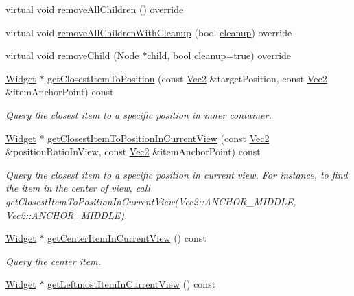 \begin{DoxyCompactItemize}
\item 
virtual void \hyperlink{classui_1_1ListView_acfa88e95692c1e9713697fbd2754379b}{remove\+All\+Children} () override
\item 
virtual void \hyperlink{classui_1_1ListView_a04bcc9bd8c55dea8f034a8380b3ab3a8}{remove\+All\+Children\+With\+Cleanup} (bool \hyperlink{classProtectedNode_a5462a6202b458193c1881bcdcc5be78d}{cleanup}) override
\item 
virtual void \hyperlink{classui_1_1ListView_ace4890246e03a8de66cfe9d0312df365}{remove\+Child} (\hyperlink{classNode}{Node} $\ast$child, bool \hyperlink{classProtectedNode_a5462a6202b458193c1881bcdcc5be78d}{cleanup}=true) override
\item 
\hyperlink{classui_1_1Widget}{Widget} $\ast$ \hyperlink{classui_1_1ListView_a3b735d6f86e49897cfa1fd064b43e1e9}{get\+Closest\+Item\+To\+Position} (const \hyperlink{classVec2}{Vec2} \&target\+Position, const \hyperlink{classVec2}{Vec2} \&item\+Anchor\+Point) const
\begin{DoxyCompactList}\small\item\em Query the closest item to a specific position in inner container. \end{DoxyCompactList}\item 
\hyperlink{classui_1_1Widget}{Widget} $\ast$ \hyperlink{classui_1_1ListView_ab96d0803fe3fde3d5691631b6c3d9803}{get\+Closest\+Item\+To\+Position\+In\+Current\+View} (const \hyperlink{classVec2}{Vec2} \&position\+Ratio\+In\+View, const \hyperlink{classVec2}{Vec2} \&item\+Anchor\+Point) const
\begin{DoxyCompactList}\small\item\em Query the closest item to a specific position in current view. For instance, to find the item in the center of view, call \textquotesingle{}get\+Closest\+Item\+To\+Position\+In\+Current\+View(\+Vec2\+::\+A\+N\+C\+H\+O\+R\+\_\+\+M\+I\+D\+D\+L\+E, Vec2\+::\+A\+N\+C\+H\+O\+R\+\_\+\+M\+I\+D\+D\+L\+E)\textquotesingle{}. \end{DoxyCompactList}\item 
\hyperlink{classui_1_1Widget}{Widget} $\ast$ \hyperlink{classui_1_1ListView_af2e7fa5bfed742f093ad2b83361cabb3}{get\+Center\+Item\+In\+Current\+View} () const
\begin{DoxyCompactList}\small\item\em Query the center item. \end{DoxyCompactList}\item 
\hyperlink{classui_1_1Widget}{Widget} $\ast$ \hyperlink{classui_1_1ListView_af04187e02ececdb0124f37f1fbee32d9}{get\+Leftmost\+Item\+In\+Current\+View} () const

\end{DoxyCompactItemize}
